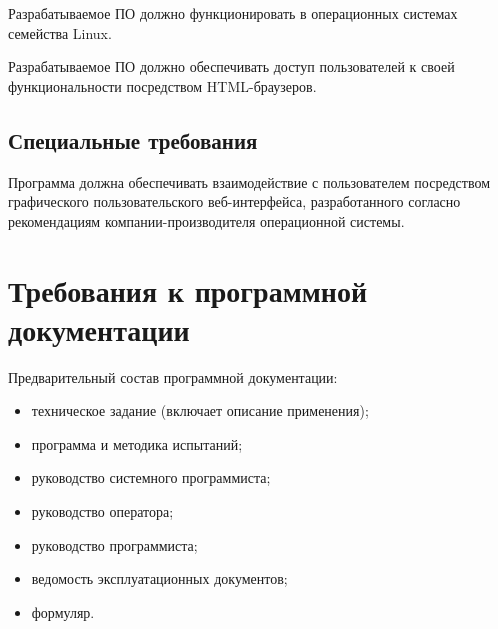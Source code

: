 \documentclass[a4page]{article}
\begin{document}
Разрабатываемое ПО должно функционировать в операционных системах семейства Linux.

Разрабатываемое ПО должно обеспечивать доступ пользователей к своей функциональности посредством HTML-браузеров.

%
%
%

\subsection{Специальные требования}

Программа должна обеспечивать взаимодействие с пользователем посредством графического пользовательского веб-интерфейса, разработанного согласно рекомендациям компании-производителя операционной системы.

\section{Требования к программной документации}

Предварительный состав программной документации:

\begin{itemize}
  \item техническое задание (включает описание применения);
  \item программа и методика испытаний;
  \item руководство системного программиста;
  \item руководство оператора;
  \item руководство программиста;
  \item ведомость эксплуатационных документов;
  \item формуляр.
\end{itemize}
\end{document}
